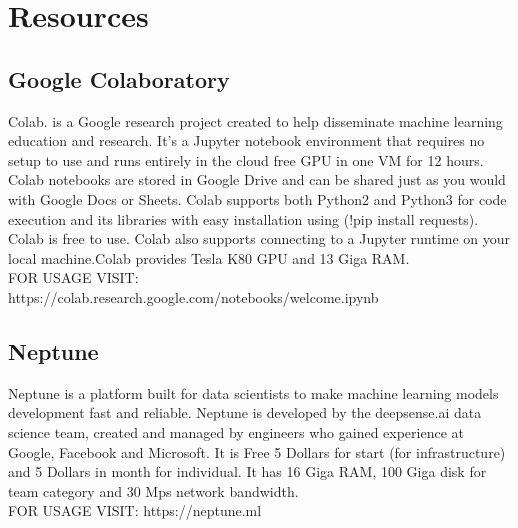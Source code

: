 \section{Resources}
\label{chap:Resources}

\subsection{Google Colaboratory}
Colab. is a Google research project created to help disseminate machine learning education and research. It's a Jupyter notebook environment that requires no setup to use and runs entirely in the cloud free GPU in one VM for 12 hours. Colab notebooks are stored in Google Drive and can be shared just as you would with Google Docs or Sheets. Colab supports both Python2 and Python3 for code execution and its libraries with easy installation using (!pip install requests). Colab is free to use. Colab also supports connecting to a Jupyter runtime on your local machine.Colab provides Tesla K80 GPU and 13 Giga RAM.\\FOR USAGE VISIT: https://colab.research.google.com/notebooks/welcome.ipynb
\subsection{Neptune}
Neptune is a platform built for data scientists to make machine learning models development fast and reliable.
Neptune is developed by the deepsense.ai data science team, created and managed by engineers who gained experience at Google, Facebook and Microsoft. It is Free 5 Dollars for start (for infrastructure) and 5 Dollars in month for individual. It has 16 Giga RAM, 100 Giga disk for team category and 30 Mps network bandwidth.\\
FOR USAGE VISIT: https://neptune.ml
